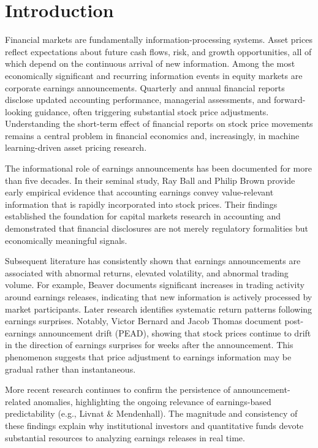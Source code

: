 \chapter{Introduction}

Financial markets are fundamentally information-processing systems. 
Asset prices reflect expectations about future cash flows, risk, and growth opportunities, all of which depend on the continuous arrival of new information. 
Among the most economically significant and recurring information events in equity markets are corporate earnings announcements. 
Quarterly and annual financial reports disclose updated accounting performance, managerial assessments, and forward-looking guidance, often triggering substantial stock price adjustments. 
Understanding the short-term effect of financial reports on stock price movements remains a central problem in financial economics and, increasingly, in machine learning-driven asset pricing research.

The informational role of earnings announcements has been documented for more than five decades. 
In their seminal study, Ray Ball and Philip Brown\cite{an-empirical-evaluation-of-accounting-income-numbers} provide early empirical evidence that accounting earnings convey value-relevant information that is rapidly incorporated into stock prices. 
Their findings established the foundation for capital markets research in accounting and demonstrated that financial disclosures are not merely regulatory formalities but economically meaningful signals.

Subsequent literature has consistently shown that earnings announcements are associated with abnormal returns, elevated volatility, and abnormal trading volume. 
For example, Beaver\cite{information-content-of-annual-earnings-announcements} documents significant increases in trading activity around earnings releases, indicating that new information is actively processed by market participants. 
Later research identifies systematic return patterns following earnings surprises. 
Notably, Victor Bernard and Jacob Thomas\cite{pead} document post-earnings announcement drift (PEAD), showing that stock prices continue to drift in the direction of earnings surprises for weeks after the announcement. 
This phenomenon suggests that price adjustment to earnings information may be gradual rather than instantaneous.

More recent research continues to confirm the persistence of announcement-related anomalies, highlighting the ongoing relevance of earnings-based predictability (e.g., Livnat \& Mendenhall\cite{compare-pead-analysts-vs-time-series}). 
The magnitude and consistency of these findings explain why institutional investors and quantitative funds devote substantial resources to analyzing earnings releases in real time.

